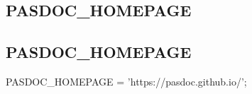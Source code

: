 \documentclass{report}
\newif\ifpdf
\begin{document}
\subsection*{\large{\textbf{PASDOC{\_}HOMEPAGE}}\normalsize\hspace{1ex}\hrulefill}
\else
\subsection*{PASDOC{\_}HOMEPAGE}
\fi
\label{PasDoc_Versions-PASDOC_HOMEPAGE}
\begin{list}{}{
\setlength{\itemindent}{0cm}
\setlength{\listparindent}{0cm}
\setlength{\leftmargin}{\evensidemargin}
\addtolength{\leftmargin}{\tmplength}
\settowidth{\labelsep}{X}
\addtolength{\leftmargin}{\labelsep}
\setlength{\labelwidth}{\tmplength}
}
\item[\textbf{Declaration}\hfill]
\ifpdf
\begin{flushleft}
\fi
\begin{ttfamily}
PASDOC{\_}HOMEPAGE = 'https://pasdoc.github.io/';\end{ttfamily}

\ifpdf
\end{flushleft}
\fi

\end{list}
\end{document}
